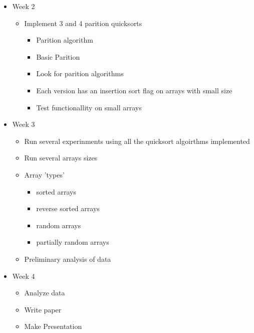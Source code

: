 \documentclass[12pt]{report}
\begin{document}
\begin{itemize}
		\item Week 2
		\begin{itemize}
			\item Implement 3 and 4 parition quicksorts
			\begin{itemize}
				\item Parition algorithm
				\item Basic Parition 
				\item Look for parition algorithms
				\item Each version has an insertion sort flag on arrays with small size
				\item Test functionallity on small arrays
			\end{itemize}
		\end{itemize}
		
		\item Week 3
		\begin{itemize}
			\item Run several experinments using all the quicksort algoirthms implemented
			\item Run several arrays sizes
			\item Array 'types'
			\begin{itemize}
				\item sorted arrays
				\item reverse sorted arrays
				\item random arrays
				\item partially random arrays
			\end{itemize}
			\item Preliminary analysis of data
		\end{itemize}
		\item Week 4
		\begin{itemize}
			\item Analyze data
			\item Write paper
			\item Make Presentation    
		\end{itemize}
	\end{itemize}

	\newpage
	\newpage
\end{document}
